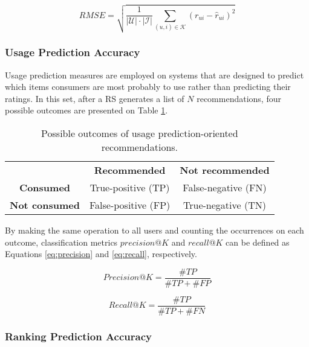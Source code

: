 \begin{equation}
\label{eq:rmse}
    RMSE = \sqrt{\frac{1}{|\mathcal{U}| \cdot |\mathcal{I}|}\sum_{(u,i) \in \mathcal{K}}(r_{ui} - \hat{r}_{ui})^2}
\end{equation}

\subsubsection{Usage Prediction Accuracy}

Usage prediction measures are employed on systems that are designed to predict which items consumers are most probably to use rather than predicting their ratings. In this set, after a RS generates a list of $N$ recommendations, four possible outcomes are presented on Table \ref{tab:usage_table}.

\begin{table}[h]
	\centering
	\begin{tabular}{@{}ccc@{}}
		& \textbf{Recommended}                     & \textbf{Not recommended}                 \\ 
		\multicolumn{1}{c|}{\textbf{Consumed}}     & \multicolumn{1}{c|}{True-positive (TP)}  & \multicolumn{1}{c|}{False-negative (FN)} \\ 
		\multicolumn{1}{c|}{\textbf{Not consumed}} & \multicolumn{1}{c|}{False-positive (FP)} & \multicolumn{1}{c|}{True-negative (TN)}  \\ 
	\end{tabular}
	\caption{Possible outcomes of usage prediction-oriented recommendations.}
	\label{tab:usage_table}
\end{table}

By making the same operation to all users and counting the occurrences on each outcome, classification metrics $precision@K$ and $recall@K$ can be defined as Equations \ref{eq:precision} and \ref{eq:recall}, respectively.

\begin{equation}
\label{eq:precision}
Precision@K = \frac{\#TP}{\#TP + \#FP}
\end{equation}

\begin{equation}
\label{eq:recall}
Recall@K = \frac{\#TP}{\#TP + \#FN}
\end{equation}

\subsubsection{Ranking Prediction Accuracy}

